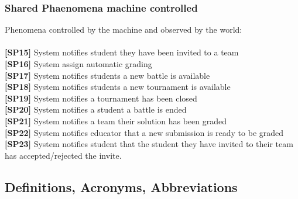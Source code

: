 \documentclass{article}
\begin{document}
\subsubsection{Shared Phaenomena machine controlled}
Phenomena controlled by the machine and observed by the world:\\\\
\textbf{[SP15]} System notifies student they have been invited to a team\\
\textbf{[SP16]} System assign automatic grading\\
\textbf{[SP17]} System notifies students a new battle is available\\
\textbf{[SP18]} System notifies students a new tournament is available\\ 
\textbf{[SP19]} System notifies a tournament has been closed\\
\textbf{[SP20]} System notifies a student a battle is ended\\
\textbf{[SP21]} System notifies a team their solution has been graded\\
\textbf{[SP22]} System notifies educator that a new submission is ready to be graded\\
\textbf{[SP23]} System notifies student that the student they have invited to their team has accepted/rejected the invite.\\
\subsection{Definitions, Acronyms, Abbreviations}
\end{document}
